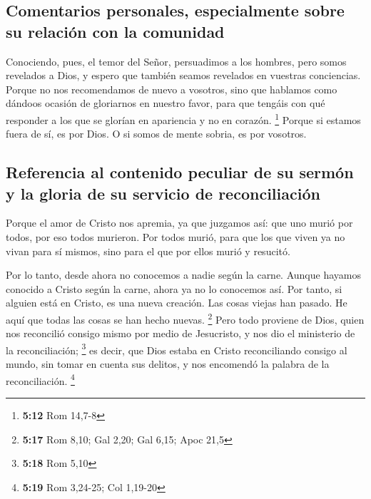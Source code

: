 \begin{paracol}{2}
\hypertarget{comentarios-personales-especialmente-sobre-su-relaciuxf3n-con-la-comunidad}{%
\subsection{Comentarios personales, especialmente sobre su relación con
la
comunidad}\label{comentarios-personales-especialmente-sobre-su-relaciuxf3n-con-la-comunidad}}

 Conociendo, pues, el temor del Señor, persuadimos a los
hombres, pero somos revelados a Dios, y espero que también seamos
revelados en vuestras conciencias.  Porque no nos
recomendamos de nuevo a vosotros, sino que hablamos como dándoos ocasión
de gloriarnos en nuestro favor, para que tengáis con qué responder a los
que se glorían en apariencia y no en corazón. \footnote{\textbf{5:12}
  Rom 14,7-8}  Porque si estamos fuera de sí, es por
Dios. O si somos de mente sobria, es por vosotros.

\hypertarget{referencia-al-contenido-peculiar-de-su-sermuxf3n-y-la-gloria-de-su-servicio-de-reconciliaciuxf3n}{%
\subsection{Referencia al contenido peculiar de su sermón y la gloria de
su servicio de
reconciliación}\label{referencia-al-contenido-peculiar-de-su-sermuxf3n-y-la-gloria-de-su-servicio-de-reconciliaciuxf3n}}

 Porque el amor de Cristo nos apremia, ya que juzgamos
así: que uno murió por todos, por eso todos murieron. 
Por todos murió, para que los que viven ya no vivan para sí mismos, sino
para el que por ellos murió y resucitó.

 Por lo tanto, desde ahora no conocemos a nadie según la
carne. Aunque hayamos conocido a Cristo según la carne, ahora ya no lo
conocemos así.  Por tanto, si alguien está en Cristo, es
una nueva creación. Las cosas viejas han pasado. He aquí que todas las
cosas se han hecho nuevas. \footnote{\textbf{5:17} Rom 8,10; Gal 2,20;
  Gal 6,15; Apoc 21,5}  Pero todo proviene de Dios, quien
nos reconcilió consigo mismo por medio de Jesucristo, y nos dio el
ministerio de la reconciliación; \footnote{\textbf{5:18} Rom 5,10}
 es decir, que Dios estaba en Cristo reconciliando
consigo al mundo, sin tomar en cuenta sus delitos, y nos encomendó la
palabra de la reconciliación. \footnote{\textbf{5:19} Rom 3,24-25; Col
  1,19-20}


\end{paracol}
